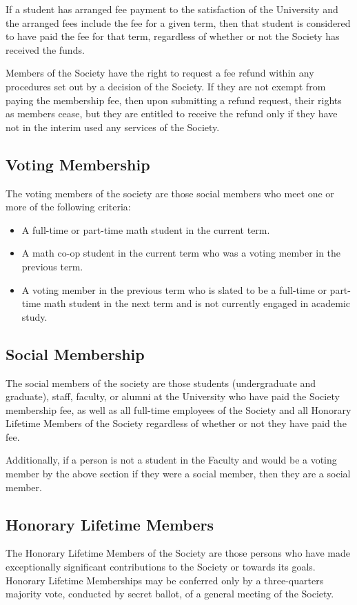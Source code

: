 If a student has arranged fee payment to the satisfaction of the University and
the arranged fees include the fee for a given term, then that student is
considered to have paid the fee for that term, regardless of whether or not the
Society has received the funds.

Members of the Society have the right to request a fee refund within any
procedures set out by a decision of the Society. If they are not exempt from
paying the membership fee, then upon submitting a refund request, their rights
as members cease, but they are entitled to receive the refund only if they have
not in the interim used any services of the Society.

\subsection{Voting Membership}
The voting members of the society are those social members who meet one or more
of the following criteria:
\begin{itemize}
  \item A full-time or part-time math student in the current term.
  \item A math co-op student in the current term who was a voting member in the
    previous term.
  \item A voting member in the previous term who is slated to be a full-time or
    part-time math student in the next term and is not currently engaged in
    academic study.
\end{itemize}

\subsection{Social Membership}
The social members of the society are those students (undergraduate and
graduate), staff, faculty, or alumni at the University who have paid the Society
membership fee, as well as all full-time employees of the Society and all
Honorary Lifetime Members of the Society regardless of whether or not they have
paid the fee.

Additionally, if a person is not a student in the Faculty and would be a voting
member by the above section if they were a social member, then they are a social
member.

\subsection{Honorary Lifetime Members}
The Honorary Lifetime Members of the Society are those persons who have made
exceptionally significant contributions to the Society or towards its goals.
Honorary Lifetime Memberships may be conferred only by a three-quarters majority
vote, conducted by secret ballot, of a general meeting of the Society.


